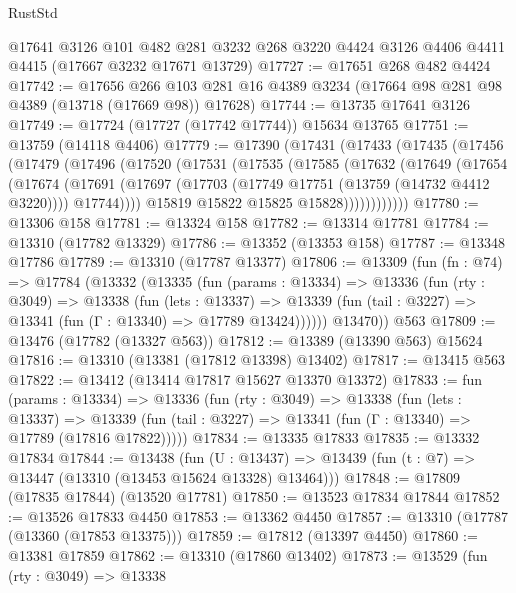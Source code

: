 \begin{lexlean}{RustStd}
\begin{coremodule}
    @17641
    @3126
    @101
    @482
    @281
    @3232
    @268
    @3220
    @4424
    @3126
    @4406
    @4411
    @4415
    (@17667 @3232 @17671 @13729)
@17727 := @17651 @268 @482 @4424
@17742 := @17656
    @266
    @103
    @281
    @16
    @4389
    @3234
    (@17664 @98 @281 @98 @4389 (@13718 (@17669 @98)) @17628)
@17744 := @13735 @17641 @3126
@17749 := @17724 (@17727 (@17742 @17744)) @15634 @13765
@17751 := @13759 (@14118 @4406)
@17779 := @17390
    (@17431
      (@17433
        (@17435
          (@17456
            (@17479
              (@17496
                (@17520
                  (@17531
                    (@17535
                      (@17585
                        (@17632
                          (@17649
                            (@17654
                              (@17674
                                (@17691
                                  (@17697
                                    (@17703 (@17749 @17751 (@13759 (@14732 @4412 @3220))))
                                    @17744))))
                            @15819
                            @15822
                            @15825
                            @15828))))))))))))
@17780 := @13306 @158
@17781 := @13324 @158
@17782 := @13314 @17781
@17784 := @13310 (@17782 @13329)
@17786 := @13352 (@13353 @158)
@17787 := @13348 @17786
@17789 := @13310 (@17787 @13377)
@17806 := @13309
    (fun (fn : @74) =>
    @17784
      (@13332
        (@13335
          (fun (params : @13334) =>
          @13336
            (fun (rty : @3049) =>
            @13338
              (fun (lets : @13337) =>
              @13339 (fun (tail : @3227) => @13341 (fun (Γ : @13340) => @17789 @13424))))))
        @13470))
    @563
@17809 := @13476 (@17782 (@13327 @563))
@17812 := @13389 (@13390 @563) @15624
@17816 := @13310 (@13381 (@17812 @13398) @13402)
@17817 := @13415 @563
@17822 := @13412 (@13414 @17817 @15627 @13370 @13372)
@17833 := fun (params : @13334) =>
  @13336
    (fun (rty : @3049) =>
    @13338
      (fun (lets : @13337) =>
      @13339 (fun (tail : @3227) => @13341 (fun (Γ : @13340) => @17789 (@17816 @17822)))))
@17834 := @13335 @17833
@17835 := @13332 @17834
@17844 := @13438
    (fun (U : @13437) => @13439 (fun (t : @7) => @13447 (@13310 (@13453 @15624 @13328) @13464)))
@17848 := @17809 (@17835 @17844) (@13520 @17781)
@17850 := @13523 @17834 @17844
@17852 := @13526 @17833 @4450
@17853 := @13362 @4450
@17857 := @13310 (@17787 (@13360 (@17853 @13375)))
@17859 := @17812 (@13397 @4450)
@17860 := @13381 @17859
@17862 := @13310 (@17860 @13402)
@17873 := @13529
    (fun (rty : @3049) =>
    @13338

\end{coremodule}
\end{lexlean}
